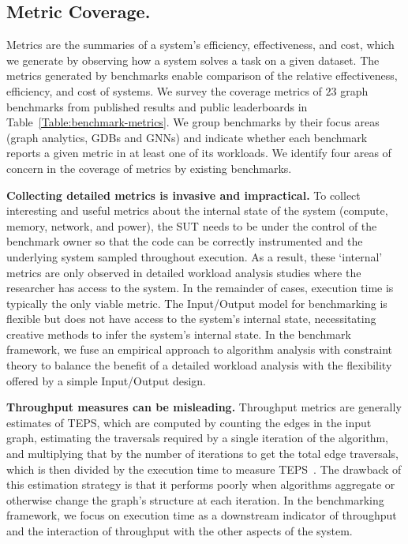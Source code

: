 
\subsection{Metric Coverage.}
Metrics are the summaries of a system's efficiency, effectiveness, and cost, which we generate by observing how a system solves a task on a given dataset.
The metrics generated by \gai benchmarks enable comparison of the relative effectiveness, efficiency, and cost of \gai systems.
We survey the coverage metrics of $23$ graph benchmarks from published results and public leaderboards in  Table~\ref{Table:benchmark-metrics}.
We group benchmarks by their focus areas (graph analytics, \ac{GDB}s and \ac{GNN}s) and indicate whether each benchmark reports a given metric in at least one of its workloads.
We identify four areas of concern in the coverage of metrics by existing benchmarks.

\textbf{Collecting detailed metrics is invasive and impractical.}
To collect interesting and useful metrics about the internal state of the \gai system (compute, memory, network, and power), the \ac{SUT} needs to be under the control of the benchmark owner so that the code can be correctly instrumented and the underlying system sampled throughout execution. 
As a result, these `internal' metrics are only observed in detailed workload analysis studies where the researcher has access to the system. 
In the remainder of cases, execution time is typically the only viable metric.
The Input/Output model for benchmarking is flexible but does not have access to the system's internal state, necessitating creative methods to infer the system's internal state.
In the \gai benchmark framework, we fuse an empirical approach to algorithm analysis with constraint theory to balance the benefit of a detailed workload analysis with the flexibility offered by a simple Input/Output design. 

\textbf{Throughput measures can be misleading.}
Throughput metrics are generally estimates of \ac{TEPS}, which are computed by counting the edges in the input graph, estimating the traversals required by a single iteration of the algorithm, and multiplying that by the number of iterations to get the total edge traversals, which is then divided by the execution time to measure \ac{TEPS}~\cite{Bader2009, Intel2020}.
The drawback of this estimation strategy is that it performs poorly when algorithms aggregate or otherwise change the graph's structure at each iteration.
In the \gai benchmarking framework, we focus on execution time as a downstream indicator of throughput and the interaction of throughput with the other aspects of the system. 

